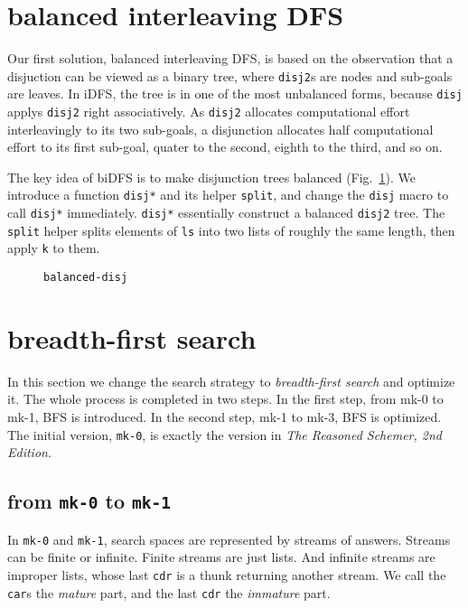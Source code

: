 \documentclass[format=acmlarge, review=true, authordraft=true]{acmart}
\begin{document}
\section{balanced interleaving DFS}

Our first solution, balanced interleaving DFS, is based on the observation that 
a disjuction can be viewed as a binary tree, where \texttt{disj2}s are nodes 
and sub-goals are leaves. In iDFS, the tree is in one of the most unbalanced 
forms, because \texttt{disj} applys \texttt{disj2} right associatively. As 
\texttt{disj2} allocates computational effort interleavingly to its two 
sub-goals, a disjunction allocates half computational effort to its first 
sub-goal, quater to the second, eighth to the third, and so on.

The key idea of biDFS is to make disjunction trees balanced 
(Fig.~\ref{balanced-disj}). We introduce a function \texttt{disj*} and its 
helper \texttt{split}, and change the \texttt{disj} macro to call 
\texttt{disj*} immediately. \texttt{disj*} essentially construct a balanced 
\texttt{disj2} tree. The \texttt{split} helper splits elements of \texttt{ls} 
into two lists of roughly the same length, then apply \texttt{k} to them.

\begin{figure}
  
  \caption{\texttt{balanced-disj}}
  \label{balanced-disj}
\end{figure}

\section{breadth-first search}

In this section we change the search strategy to \textit{breadth-first search} 
and optimize it. The whole process is completed in two steps. In the first 
step, from mk-0 to mk-1, BFS is introduced. In the second step, mk-1 to mk-3, 
BFS is optimized. The initial version, \texttt{mk-0}, is exactly the version in 
\emph{The Reasoned Schemer, 2nd Edition}.

\subsection{from \texttt{mk-0} to \texttt{mk-1}}

In \texttt{mk-0} and \texttt{mk-1}, search spaces are represented by streams of 
answers. Streams can be finite or infinite. Finite streams are just lists. And 
infinite streams are improper lists, whose last \texttt{cdr} is a thunk 
returning another stream. We call the \texttt{car}s the \emph{mature} part, and 
the last \texttt{cdr} the \emph{immature} part. 
\end{document}
